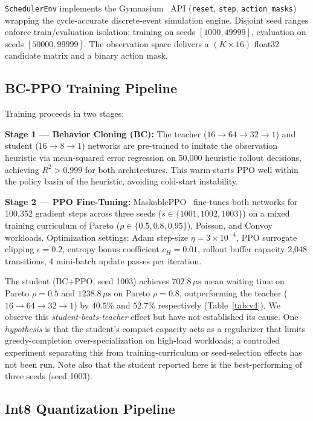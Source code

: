 \texttt{SchedulerEnv} implements the Gymnasium~\cite{Gymnasium2023} API
(\texttt{reset}, \texttt{step}, \texttt{action\_masks}) wrapping the
cycle-accurate discrete-event simulation engine. Disjoint seed ranges enforce
train/evaluation isolation: training on seeds $[1000, 49999]$, evaluation on
seeds $[50000, 99999]$. The observation space delivers a
$(K \times 16)$ float32 candidate matrix and a binary action mask.

\subsection{BC-PPO Training Pipeline}
\label{subsec:training}

Training proceeds in two stages:

\textbf{Stage 1 --- Behavior Cloning (BC):} The teacher ($16\to 64\to 32\to 1$)
and student ($16\to 8\to 1$) networks are pre-trained to imitate the
observation heuristic via mean-squared error regression on 50{,}000 heuristic
rollout decisions, achieving $R^2 > 0.999$ for both architectures. This
warm-starts PPO well within the policy basin of the heuristic, avoiding cold-start
instability.

\textbf{Stage 2 --- PPO Fine-Tuning:} MaskablePPO~\cite{Huang2022} fine-tunes
both networks for 100{,}352 gradient steps across three seeds
($s \in \{1001, 1002, 1003\}$) on a mixed training curriculum of Pareto
($\rho \in \{0.5, 0.8, 0.95\}$), Poisson, and Convoy workloads.
Optimization settings: Adam step-size $\eta = 3 \times 10^{-4}$,
PPO surrogate clipping $\epsilon = 0.2$, entropy bonus coefficient $c_H = 0.01$,
rollout buffer capacity 2{,}048 transitions, 4 mini-batch update passes per iteration.

The student (BC+PPO, seed 1003) achieves $702.8\,\mu\text{s}$ mean waiting
time on Pareto $\rho = 0.5$ and $1238.8\,\mu\text{s}$ on Pareto $\rho = 0.8$,
outperforming the teacher ($16\to 64\to 32\to 1$) by $40.5\%$ and
$52.7\%$ respectively (Table~\ref{tab:v4}). We observe this
\emph{student-beats-teacher} effect but have not established its cause. One
\emph{hypothesis} is that the student's compact capacity acts as a
regularizer that limits greedy-completion over-specialization on high-load
workloads; a controlled experiment separating this from training-curriculum or
seed-selection effects has not been run. Note also that the student reported
here is the best-performing of three seeds (seed 1003).



\subsection{Int8 Quantization Pipeline}
\label{subsec:quant}

